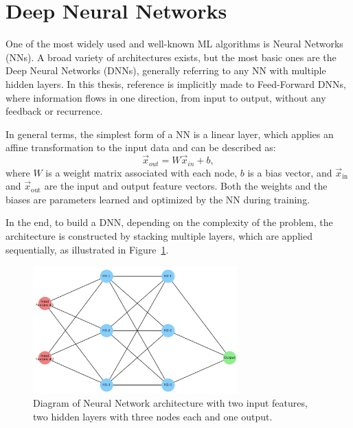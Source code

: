 \section{Deep Neural Networks}
\label{sec:dnn_general}

One of the most widely used and well-known ML algorithms is Neural Networks (NNs). A broad variety of architectures exists, but the most basic ones are the Deep Neural Networks (DNNs), generally referring to any NN with multiple hidden layers. In this thesis, reference is implicitly made to Feed-Forward DNNs, where information flows in one direction, from input to output, without any feedback or recurrence.

In general terms, the simplest form of a NN is a linear layer, which applies an affine transformation to the input data and can be described as:
\begin{equation}
    \vec{x}_{out} = W\vec{x}_{in} + b,
\end{equation}
where $W$ is a weight matrix associated with each node, $b$ is a bias vector, and $\vec{x}_{\text{in}}$ and $\vec{x}_{\text{out}}$ are the input and output feature vectors. Both the weights and the biases are parameters learned and optimized by the NN during training.

In the end, to build a DNN, depending on the complexity of the problem, the architecture is constructed by stacking multiple layers, which are applied sequentially, as illustrated in Figure~\ref{fig:dnn}.
\begin{figure}[htbp]
    \centering
    \includegraphics[width=0.7\textwidth]{images/dnn.png}
    \caption{Diagram of Neural Network architecture with two input features, two hidden layers with three nodes each and one output.}
    \label{fig:dnn}
  \end{figure}

